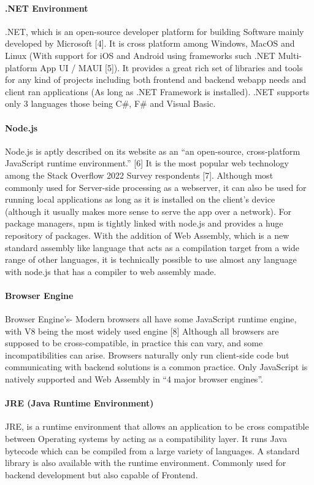 \paragraph{.NET Environment}
.NET, which is an open-source developer platform for building Software mainly developed by Microsoft [4]. It is cross platform among Windows, MacOS and Linux (With support for iOS and Android using frameworks such .NET Multi-platform App UI / MAUI [5]). It provides a great rich set of libraries and tools for any kind of projects including both frontend and backend webapp needs and client ran applications (As long as .NET Framework is installed). .NET supports only 3 languages those being C\#, F\# and Visual Basic.

\paragraph{Node.js}
Node.js is aptly described on its website as an “an open-source, cross-platform JavaScript runtime environment.” [6] It is the most popular web technology among the Stack Overflow 2022 Survey respondents [7]. Although most commonly used for Server-side processing as a webserver, it can also be used for running local applications as long as it is installed on the client’s device (although it usually makes more sense to serve the app over a network). For package managers, npm is tightly linked with node.js and provides a huge repository of packages. With the addition of Web Assembly, which is a new standard assembly like language that acts as a compilation target from a wide range of other languages, it is technically possible to use almost any language with node.js that has a compiler to web assembly made.

\paragraph{Browser Engine}
Browser Engine’s- Modern browsers all have some JavaScript runtime engine, with V8 being the most widely used engine [8] Although all browsers are supposed to be cross-compatible, in practice this can vary, and some incompatibilities can arise. Browsers naturally only run client-side code but communicating with backend solutions is a common practice. Only JavaScript is natively supported and Web Assembly in “4 major browser engines”.

\paragraph{JRE (Java Runtime Environment)}
JRE, is a runtime environment that allows an application to be cross compatible between Operating systems by acting as a compatibility layer. It runs Java bytecode which can be compiled from a large variety of languages. A standard library is also available with the runtime environment. Commonly used for backend development but also capable of Frontend.

